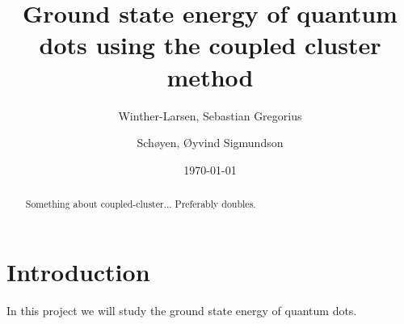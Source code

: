 \documentclass[
    a4paper, aps, twocolumn, floatfix, superscriptaddress,
    nofootinbib]{revtex4-1}
\newcommand{\1}{\mathds{1}}
\begin{document}
\title{Ground state energy of quantum dots using the coupled cluster method}
\author{Winther-Larsen, Sebastian Gregorius}
\author{Schøyen, Øyvind Sigmundson}
\date{\today}

\begin{abstract}
    Something about coupled-cluster... Preferably doubles.
\end{abstract}

\maketitle
\tableofcontents

\section{Introduction}
    In this project we will study the ground state energy of quantum dots.
\end{document}
